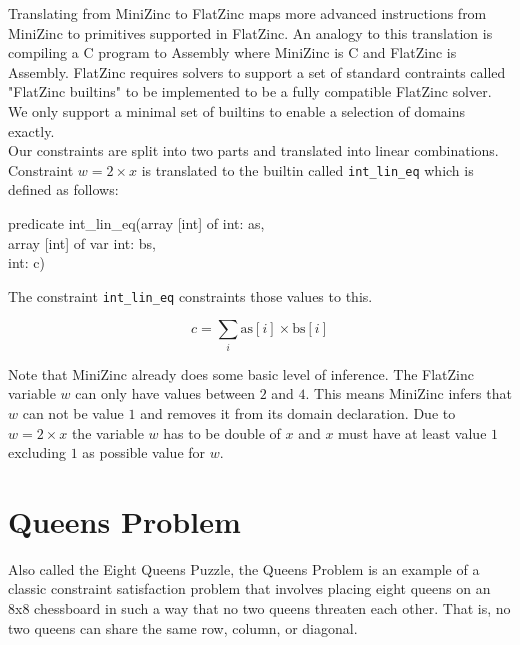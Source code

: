 Translating from MiniZinc to FlatZinc maps more advanced instructions from MiniZinc to primitives supported in FlatZinc. An analogy to this translation is compiling a C program to Assembly where MiniZinc is C and FlatZinc is Assembly. FlatZinc requires solvers to support a set of standard contraints called "FlatZinc builtins" to be implemented to be a fully compatible FlatZinc solver. We only support a minimal set of builtins to enable a selection of domains exactly. \\

Our constraints are split into two parts and translated into linear combinations. Constraint $w = 2 \times x$ is translated to the builtin called \verb|int_lin_eq| which is defined as follows:

\begin{tcolorbox}[title=int\_lin\_eq builtin]
	predicate int\_lin\_eq(array [int] of int: as,\\
	array [int] of var int: bs,\\
	int: c)
\end{tcolorbox}

The constraint \verb|int_lin_eq| constraints those values to this.

\begin{tcolorbox}[title=int\_lin\_eq builtin constraint]
	\begin{equation}
		c = \sum_{i} \text{as}[i] \times \text{bs}[i]
	\end{equation}
\end{tcolorbox}

Note that MiniZinc already does some basic level of inference. The FlatZinc variable $w$ can only have values between $2$ and $4$. This means MiniZinc infers that $w$ can not be value $1$ and removes it from its domain declaration. Due to $w = 2 \times x$ the variable $w$ has to be double of $x$ and $x$ must have at least value $1$ excluding $1$ as possible value for $w$.

\section{Queens Problem} \label{sec:queens}

Also called the Eight Queens Puzzle, the Queens Problem is an example of a classic constraint satisfaction problem that involves placing eight queens on an 8x8 chessboard in such a way that no two queens threaten each other. That is, no two queens can share the same row, column, or diagonal.

